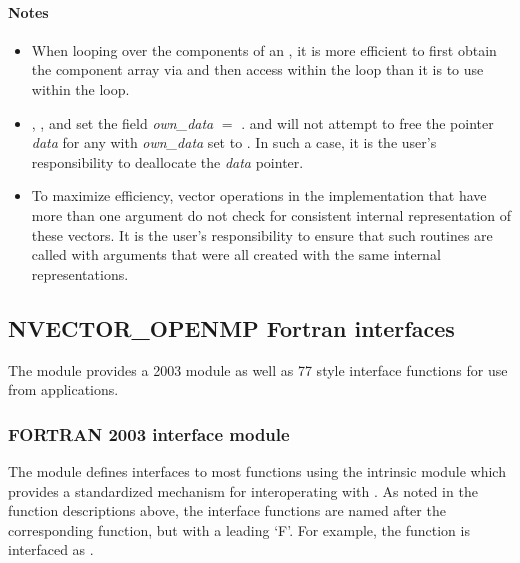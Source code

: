 \paragraph{\bf Notes}

\begin{itemize}

\item
  When looping over the components of an  , it is
  more efficient to first obtain the component array via
   and then access  within the
  loop than it is to use  within the loop.

\item
  {\warn}, ,
  and  set the field
  {\em own\_data} $=$ .
   and 
  will not attempt to free the pointer {\em data} for any  with
  {\em own\_data} set to . In such a case, it is the user's responsibility to
  deallocate the {\em data} pointer.

\item
  {\warn}To maximize efficiency, vector operations in the {\nvecopenmp} implementation
  that have more than one  argument do not check for
  consistent internal representation of these vectors. It is the user's
  responsibility to ensure that such routines are called with 
  arguments that were all created with the same internal representations.

\end{itemize}


\subsection{NVECTOR\_OPENMP Fortran interfaces}
\label{ss:nvec_openmp_fortran}

The {\nvecopenmp} module provides a {\F} 2003 module as well as {\F} 77
style interface functions for use from {\F} applications.

\subsubsection*{FORTRAN 2003 interface module}
The  {\F} module defines interfaces to most
{\nvecopenmp} {\CC} functions using the intrinsic 
module which provides a standardized mechanism for interoperating with {\CC}. As
noted in the {\CC} function descriptions above, the interface functions are
named after the corresponding {\CC} function, but with a leading `F'. For
example, the function  is interfaced as
.

